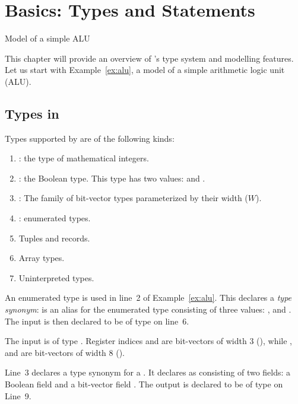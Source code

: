 \chapter{Basics: Types and Statements}
\begin{uclidlisting}[htbp]
    
    \caption{Model of a simple ALU}
\label{ex:alu}
\end{uclidlisting}

This chapter will provide an overview of \uclid{}'s type system and modelling features. Let us start with Example~\ref{ex:alu}, a model of a simple arithmetic logic unit (ALU).

\section{Types in \uclid{}}

Types supported by \uclid{} are of the following kinds:
\begin{enumerate}
    \item {}: the type of mathematical integers.
    \item {}: the Boolean type. This type has two values:  and .
    \item {}: The family of bit-vector types parameterized by their width ($W$).
    \item {}: enumerated types.
    \item Tuples and records.
    \item Array types.
    \item Uninterpreted types.
\end{enumerate}

An enumerated type is used in line~2 of Example~\ref{ex:alu}. This declares a \textit{type synonym}:  is an alias for the enumerated type consisting of three values: ,  and . The input  is then declared to be of type  on line~6.

The input  is of type . Register indices  and  are bit-vectors of width 3 (), while ,  and  are bit-vectors of width 8 ().

Line~3 declares a type synonym for a . It declares  as consisting of two fields: a Boolean field  and a bit-vector field . The output  is declared to be of type  on Line~9.

